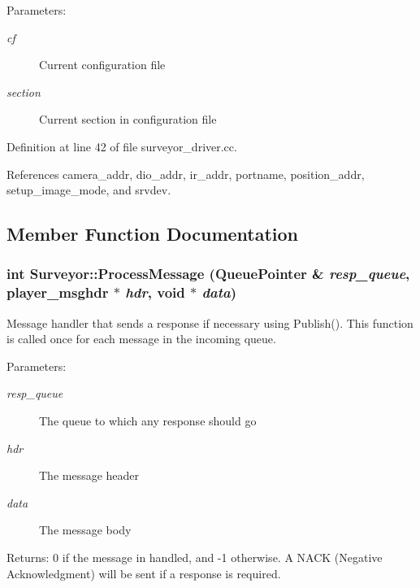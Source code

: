 \begin{Desc}
\item[Parameters:]
\begin{description}
\item[{\em cf}]Current configuration file \item[{\em section}]Current section in configuration file \end{description}
\end{Desc}


Definition at line 42 of file surveyor\_\-driver.cc.

References camera\_\-addr, dio\_\-addr, ir\_\-addr, portname, position\_\-addr, setup\_\-image\_\-mode, and srvdev.

\subsection{Member Function Documentation}
\hypertarget{classSurveyor_9af107b9b363d15951303c3cbaf4328f}{
\subsubsection[{ProcessMessage}]{\setlength{\rightskip}{0pt plus 5cm}int Surveyor::ProcessMessage (QueuePointer \& {\em resp\_\-queue}, \/  player\_\-msghdr $\ast$ {\em hdr}, \/  void $\ast$ {\em data})}}
\label{classSurveyor_9af107b9b363d15951303c3cbaf4328f}


Message handler that sends a response if necessary using Publish(). This function is called once for each message in the incoming queue. 

\begin{Desc}
\item[Parameters:]
\begin{description}
\item[{\em resp\_\-queue}]The queue to which any response should go \item[{\em hdr}]The message header \item[{\em data}]The message body \end{description}
\end{Desc}
\begin{Desc}
\item[Returns:]0 if the message in handled, and -1 otherwise. A NACK (Negative Acknowledgment) will be sent if a response is required. \end{Desc}



